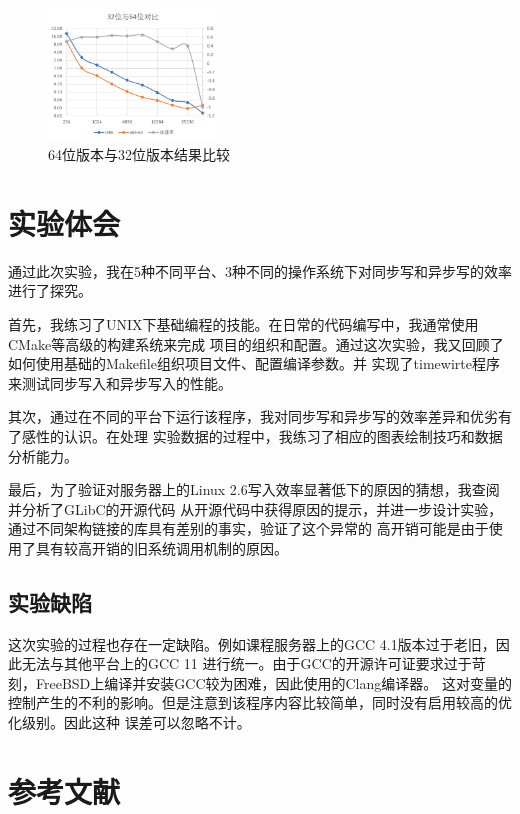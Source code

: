 \documentclass[a4paper,twoside]{article}
\begin{document}
\begin{spacing}{1.2}
\begin{figure}[htb]
	\centering
	\caption{64位版本与32位版本结果比较}
	\label{fig:64bit}
	\includegraphics[width=0.4\textwidth]{64bit.png}
\end{figure}



\section{实验体会}

通过此次实验，我在5种不同平台、3种不同的操作系统下对同步写和异步写的效率进行了探究。

首先，我练习了UNIX下基础编程的技能。在日常的代码编写中，我通常使用CMake等高级的构建系统来完成
项目的组织和配置。通过这次实验，我又回顾了如何使用基础的Makefile组织项目文件、配置编译参数。并
实现了timewirte程序来测试同步写入和异步写入的性能。

其次，通过在不同的平台下运行该程序，我对同步写和异步写的效率差异和优劣有了感性的认识。在处理
实验数据的过程中，我练习了相应的图表绘制技巧和数据分析能力。

最后，为了验证对服务器上的Linux 2.6写入效率显著低下的原因的猜想，我查阅并分析了GLibC的开源代码
从开源代码中获得原因的提示，并进一步设计实验，通过不同架构链接的库具有差别的事实，验证了这个异常的
高开销可能是由于使用了具有较高开销的旧系统调用机制的原因。

\subsection{实验缺陷}

这次实验的过程也存在一定缺陷。例如课程服务器上的GCC 4.1版本过于老旧，因此无法与其他平台上的GCC 11
进行统一。由于GCC的开源许可证要求过于苛刻，FreeBSD上编译并安装GCC较为困难，因此使用的Clang编译器。
这对变量的控制产生的不利的影响。但是注意到该程序内容比较简单，同时没有启用较高的优化级别。因此这种
误差可以忽略不计。

\clearpage
\section*{参考文献}


\end{spacing}
\end{document}
